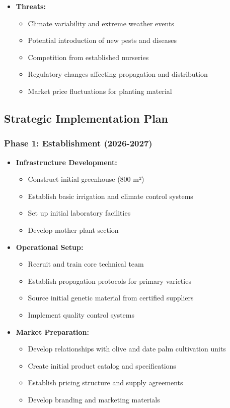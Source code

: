 \begin{itemize}
    \item \textbf{Threats:}
    \begin{itemize}
        \item Climate variability and extreme weather events
        \item Potential introduction of new pests and diseases
        \item Competition from established nurseries
        \item Regulatory changes affecting propagation and distribution
        \item Market price fluctuations for planting material
    \end{itemize}
\end{itemize}

\subsection{Strategic Implementation Plan}

\subsubsection{Phase 1: Establishment (2026-2027)}
\begin{itemize}
    \item \textbf{Infrastructure Development:}
    \begin{itemize}
        \item Construct initial greenhouse (800 m²)
        \item Establish basic irrigation and climate control systems
        \item Set up initial laboratory facilities
        \item Develop mother plant section
    \end{itemize}
    
    \item \textbf{Operational Setup:}
    \begin{itemize}
        \item Recruit and train core technical team
        \item Establish propagation protocols for primary varieties
        \item Source initial genetic material from certified suppliers
        \item Implement quality control systems
    \end{itemize}
    
    \item \textbf{Market Preparation:}
    \begin{itemize}
        \item Develop relationships with olive and date palm cultivation units
        \item Create initial product catalog and specifications
        \item Establish pricing structure and supply agreements
        \item Develop branding and marketing materials
    \end{itemize}
\end{itemize}

